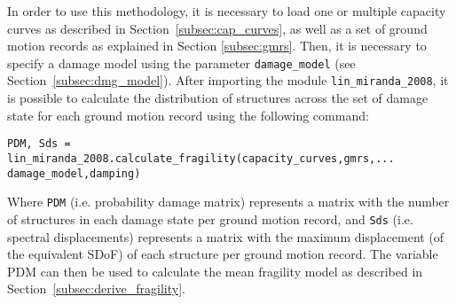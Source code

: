 In order to use this methodology, it is necessary to load one or multiple capacity curves as described in Section~\ref{subsec:cap_curves}, as well as a set of ground motion records as explained in Section \ref{subsec:gmrs}. Then, it is necessary to specify a damage model using the parameter \verb=damage_model= (see Section~\ref{subsec:dmg_model}). After importing the module \verb=lin_miranda_2008=, it is possible to calculate the distribution of structures across the set of damage state for each ground motion record using the following command:

\begin{Verbatim}[frame=single, commandchars=\\\{\}, samepage=true]
PDM, Sds = lin_miranda_2008.calculate_fragility(capacity_curves,gmrs,...
damage_model,damping)
\end{Verbatim}

Where \verb=PDM= (i.e. probability damage matrix) represents a matrix with the number of structures in each damage state per ground motion record, and \verb=Sds= (i.e. spectral displacements) represents a matrix with the maximum displacement (of the equivalent SDoF) of each structure per ground motion record. The variable PDM can then be used to calculate the mean fragility model as described in Section~\ref{subsec:derive_fragility}.